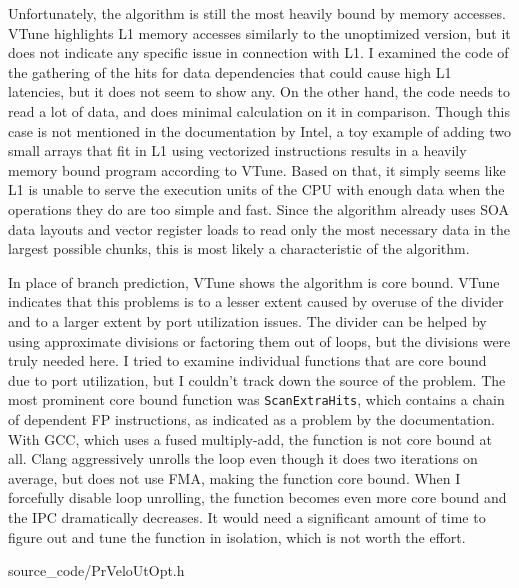 \documentclass[12pt]{article}
\newcommand{\code}[1]{\texttt{#1}}
\begin{document}
Unfortunately, the algorithm is still the most heavily bound by memory accesses. VTune highlights L1 memory accesses similarly to the unoptimized version, but it does not indicate any specific issue in connection with L1. I examined the code of the gathering of the hits for data dependencies that could cause high L1 latencies, but it does not seem to show any. On the other hand, the code needs to read a lot of data, and does minimal calculation on it in comparison. Though this case is not mentioned in the documentation by Intel, a toy example of adding two small arrays that fit in L1 using vectorized instructions results in a heavily memory bound program according to VTune. Based on that, it simply seems like L1 is unable to serve the execution units of the CPU with enough data when the operations they do are too simple and fast. Since the algorithm already uses SOA data layouts and vector register loads to read only the most necessary data in the largest possible chunks, this is most likely a characteristic of the algorithm.


\vspace{1pc}

In place of branch prediction, VTune shows the algorithm is core bound. VTune indicates that this problems is to a lesser extent caused by overuse of the divider and to a larger extent by port utilization issues. The divider can be helped by using approximate divisions or factoring them out of loops, but the divisions were truly needed here. I tried to examine individual functions that are core bound due to port utilization, but I couldn't track down the source of the problem. The most prominent core bound function was \code{ScanExtraHits}, which contains a chain of dependent FP instructions, as indicated as a problem by the documentation\cite{intel_vtune_docs}. With GCC, which uses a fused multiply-add, the function is not core bound at all. Clang aggressively unrolls the loop even though it does two iterations on average, but does not use FMA, making the function core bound. When I forcefully disable loop unrolling, the function becomes even more core bound and the IPC dramatically decreases. It would need a significant amount of time to figure out and tune the function in isolation, which is not worth the effort.


	{source_code/PrVeloUtOpt.h}
\end{document}
